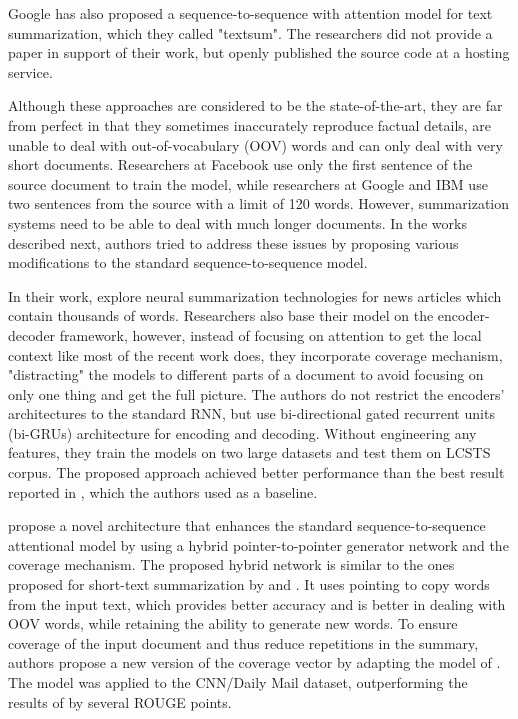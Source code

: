\documentclass[11pt,a4paper,onecolumn]{article}
\begin{document}
Google has also proposed a sequence-to-sequence with attention model for text summarization, which they called "textsum".
The researchers did not provide a paper in support of their work, but openly published the source code \cite{LiuGoogle2016} at a hosting service.

Although these approaches are considered to be the state-of-the-art, they are far from perfect in that they sometimes inaccurately reproduce factual details, are unable to deal with out-of-vocabulary (OOV) words and can only deal with very short documents.
Researchers at Facebook use only the first sentence of the source document to train the model, while researchers at Google and IBM use two sentences from the source with a limit of 120 words.
However, summarization systems need to be able to deal with much longer documents.
In the works described next, authors tried to address these issues by proposing various modifications to the standard sequence-to-sequence model.

In their work, \cite{chen2016distraction} explore neural summarization technologies for news articles which contain thousands of words.
Researchers also base their model on the encoder-decoder framework, however, instead of focusing on attention to get the local context like most of the recent work does, they incorporate coverage mechanism, "distracting" the models to different parts of a document to avoid focusing on only one thing and get the full picture.
The authors do not restrict the encoders' architectures to the standard RNN, but use bi-directional gated recurrent units (bi-GRUs) architecture for encoding and decoding.
Without engineering any features, they train the models on two large datasets and test them on LCSTS corpus.
The proposed approach achieved better performance than the best result reported in \cite{hu2015lcsts}, which the authors used as a baseline.

\cite{see2017get} propose a novel architecture that enhances the standard sequence-to-sequence attentional model by using a hybrid pointer-to-pointer generator network and the coverage mechanism.
The proposed hybrid network is similar to the ones proposed for short-text summarization by \cite{gu2016incorporating} and \cite{miao2016language}.
It uses pointing \cite{vinyals2015pointer} to copy words from the input text, which provides better accuracy and is better in dealing with OOV words, while retaining the ability to generate new words.
To ensure coverage of the input document and thus reduce repetitions in the summary, authors propose a new version of the coverage vector by adapting the model of \cite{tu2016modeling}.
The model was applied to the CNN/Daily Mail dataset, outperforming the results of \cite{nallapati2016abstractive} by several ROUGE points.
\end{document}

